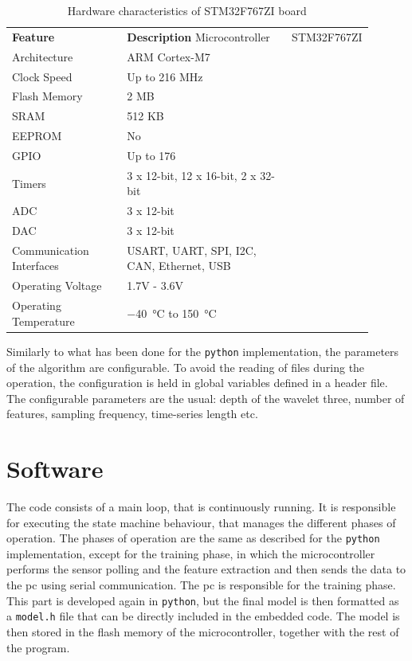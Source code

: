 \begin{longtable}{p{0.35\linewidth}p{0.55\linewidth}}
    \caption{Hardware characteristics of STM32F767ZI board}    \label{tab:stm32f767zi}\\
    \toprule
    \textbf{Feature} & \textbf{Description} \endfirsthead 
    \hline
    Microcontroller & STM32F767ZI \\
    Architecture & ARM Cortex-M7 \\
    Clock Speed & Up to 216 MHz \\
    Flash Memory & 2 MB \\
    SRAM & 512 KB \\
    EEPROM & No \\
    GPIO & Up to 176 \\
    Timers & 3 x 12-bit, 12 x 16-bit, 2 x 32-bit \\
    ADC & 3 x 12-bit \\
    DAC & 3 x 12-bit \\
    Communication Interfaces & USART, UART, SPI, I2C, CAN, Ethernet, USB \\
    Operating Voltage & 1.7V - 3.6V \\
    Operating Temperature & \SI{-40}{\celsius} to \SI{+150}{\celsius} \\
    \bottomrule    
\end{longtable}

Similarly to what has been done for the \texttt{python} implementation, the parameters of the algorithm are configurable. To avoid the reading of files during the operation, the configuration is held in global variables defined in a header file. The configurable parameters are the usual: depth of the wavelet three, number of features, sampling frequency, time-series length etc.

\section{Software}
The code consists of a main loop, that is continuously running. It is responsible for executing the state machine behaviour, that manages the different phases of operation. The phases of operation are the same as described for the \texttt{python} implementation, except for the training phase, in which the microcontroller performs the sensor polling and the feature extraction and then sends the data to the \gls{pc} using serial communication. The \gls{pc} is responsible for the training phase. This part is developed again in \texttt{python}, but the final model is then formatted as a \texttt{model.h} file that can be directly included in the embedded code. The model is then stored in the flash memory of the microcontroller, together with the rest of the program.

